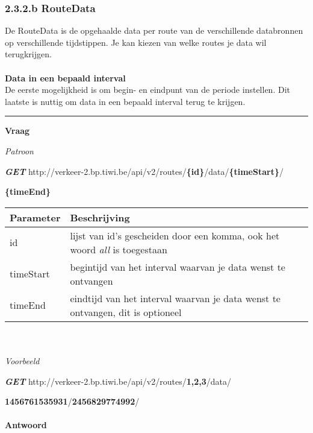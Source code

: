 \documentclass[ps,a4paper,oneside]{report}
\begin{document}
\subsubsection{2.3.2.b RouteData}
De RouteData is de opgehaalde data per route van de verschillende databronnen op verschillende tijdstippen. Je kan kiezen van welke routes je data wil terugkrijgen.\\\\
\textbf{Data in een bepaald interval}\\
De eerste mogelijkheid is om begin- en eindpunt van de periode instellen. Dit laatste is nuttig om data in een bepaald interval terug te krijgen.\\
\noindent\rule[0.5ex]{\linewidth}{1pt}
\textbf{Vraag}

\textit{Patroon}

\textbf{\textit{GET}}
 http://verkeer-2.bp.tiwi.be/api/v2/routes/\textbf{\{id\}}/data/\textbf{\{timeStart\}}/
 
 \textbf{\{timeEnd\}}\\
 
 \begin{tabular}{ | l | p{8.5 cm}| }
 	\hline
 	\textbf{Parameter} & \textbf{Beschrijving}\\
 	\hline
 	id & lijst van id's gescheiden door een komma, ook het woord \textit{all} is toegestaan\\
 	\hline
 	timeStart & begintijd van het interval waarvan je data wenst te ontvangen\\
 	\hline
 	timeEnd & eindtijd van het interval waarvan je data wenst te ontvangen, dit is optioneel\\
 	\hline
 \end{tabular}\\\\
 
\textit{Voorbeeld}

\textbf{\textit{GET}}
 http://verkeer-2.bp.tiwi.be/api/v2/routes/\textbf{1,2,3}/data/
 
 \textbf{1456761535931}/\textbf{2456829774992}/\\\\ 
\textbf{Antwoord}
\end{document}
